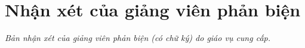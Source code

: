 \chapter*{Nhận xét của giảng viên phản biện}
\label{reviewer}

\textit{Bản nhận xét của giảng viên phản biện (có chữ ký) do giáo vụ cung cấp.}

\vfill
